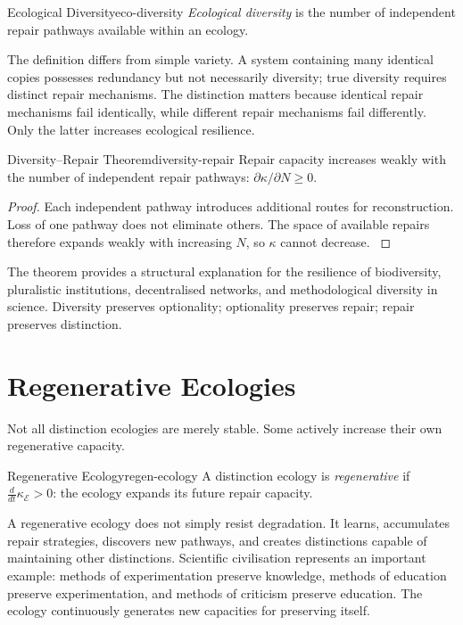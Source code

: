 \documentclass[12pt,twoside,openright]{book}
\begin{document}
\begin{definition}{Ecological Diversity}{eco-diversity}
  \emph{Ecological diversity} is the number of independent
  repair pathways available within an ecology.
\end{definition}

The definition differs from simple variety. A system
containing many identical copies possesses redundancy but
not necessarily diversity; true diversity requires distinct
repair mechanisms. The distinction matters because
identical repair mechanisms fail identically, while
different repair mechanisms fail differently. Only the
latter increases ecological resilience.

\begin{theorem}{Diversity--Repair Theorem}{diversity-repair}
  Repair capacity increases weakly with the number of
  independent repair pathways:
  $\partial\kappa/\partial N \ge 0$.
\end{theorem}

\begin{proof}
  Each independent pathway introduces additional routes for
  reconstruction. Loss of one pathway does not eliminate
  others. The space of available repairs therefore expands
  weakly with increasing $N$, so $\kappa$ cannot decrease.
  \parencite{tilman1996}
\end{proof}

The theorem provides a structural explanation for the
resilience of biodiversity, pluralistic institutions,
decentralised networks, and methodological diversity in
science. Diversity preserves optionality; optionality
preserves repair; repair preserves distinction.

\section{Regenerative Ecologies}
\label{sec:ch12-regen-ecologies}

Not all distinction ecologies are merely stable. Some
actively increase their own regenerative capacity.

\begin{definition}{Regenerative Ecology}{regen-ecology}
  A distinction ecology is \emph{regenerative} if
  $\frac{d}{dt}\kappa_\mathcal{E} > 0$: the ecology expands
  its future repair capacity.
\end{definition}

A regenerative ecology does not simply resist degradation.
It learns, accumulates repair strategies, discovers new
pathways, and creates distinctions capable of maintaining
other distinctions. Scientific civilisation represents an
important example: methods of experimentation preserve
knowledge, methods of education preserve experimentation,
and methods of criticism preserve education. The ecology
continuously generates new capacities for preserving
itself.
\end{document}
